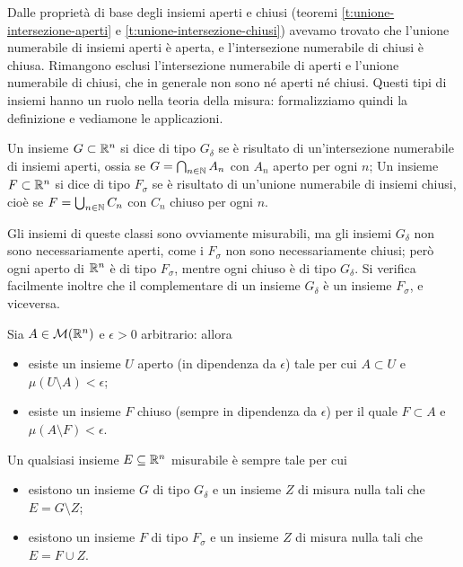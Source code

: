 Dalle proprietà di base degli insiemi aperti e chiusi (teoremi \ref{t:unione-intersezione-aperti} e \ref{t:unione-intersezione-chiusi}) avevamo trovato che l'unione numerabile di insiemi aperti è aperta, e l'intersezione numerabile di chiusi è chiusa.
Rimangono esclusi l'intersezione numerabile di aperti e l'unione numerabile di chiusi, che in generale non sono n\'e aperti n\'e chiusi.
Questi tipi di insiemi hanno un ruolo nella teoria della misura: formalizziamo quindi la definizione e vediamone le applicazioni.
\begin{definizione} \label{d:gdelta-fsigma}
	Un insieme $G\subset\mathbb{R}^n$ si dice di tipo $G_\delta$ se è risultato di un'intersezione numerabile di insiemi aperti, ossia se $G=\bigcap_{n\in\mathbb{N}}A_n$ con $A_n$ aperto per ogni $n$;
	Un insieme $F\subset\mathbb{R}^n$ si dice di tipo $F_\sigma$ se è risultato di un'unione numerabile di insiemi chiusi, cioè se $F=\bigcup_{n\in\mathbb{N}}C_n$ con $C_n$ chiuso per ogni $n$.
\end{definizione}
Gli insiemi di queste classi sono ovviamente misurabili, ma gli insiemi $G_\delta$ non sono necessariamente aperti, come i $F_\sigma$ non sono necessariamente chiusi; però ogni aperto di $\mathbb{R}^n$ è di tipo $F_\sigma$, mentre ogni chiuso è di tipo $G_\delta$.
Si verifica facilmente inoltre che il complementare di un insieme $G_\delta$ è un insieme $F_\sigma$, e viceversa.
\begin{lemma} \label{l:aperti-chiusi-poco-differenti}
	Sia $A\in\mathcal M(\mathbb{R}^n)$ e $\epsilon>0$ arbitrario: allora
	\begin{itemize}
		\item esiste un insieme $U$ aperto (in dipendenza da $\epsilon$) tale per cui $A\subset U$ e $\mu(U\setminus A)<\epsilon$;
		\item esiste un insieme $F$ chiuso (sempre in dipendenza da $\epsilon$) per il quale $F\subset A$ e $\mu(A\setminus F)<\epsilon$.
	\end{itemize}
\end{lemma}
\begin{teorema} \label{t:gdelta-fsigma-misurabili}
	Un qualsiasi insieme $E\subseteq\mathbb{R}^n$ misurabile è sempre tale per cui
	\begin{itemize}
		\item esistono un insieme $G$ di tipo $G_\delta$ e un insieme $Z$ di misura nulla tali che $E=G\setminus Z$;
		\item esistono un insieme $F$ di tipo $F_\sigma$ e un insieme $Z$ di misura nulla tali che $E=F\cup Z$.
	\end{itemize}
\end{teorema}
